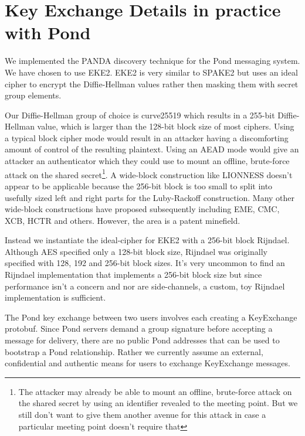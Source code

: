 \documentclass[letterpaper,twocolumn,10pt]{article}
\begin{document}
\section{Key Exchange Details in practice with Pond}

We implemented the PANDA discovery technique for the Pond\cite{pond} messaging
system. We have chosen to use EKE2\cite{bellare2000authenticated}. EKE2 is very
similar to SPAKE2 but uses an ideal cipher to encrypt the Diffie-Hellman values
rather then masking them with secret group elements.

Our Diffie-Hellman group of choice is curve25519\cite{bernstein2006curve25519}
which results in a 255-bit Diffie-Hellman value, which is larger than the
128-bit block size of most ciphers. Using a typical block cipher mode would
result in an attacker having a discomforting amount of control of the resulting
plaintext. Using an AEAD mode would give an attacker an authenticator which
they could use to mount an offline, brute-force attack on the shared
secret\footnote{The attacker may already be able to mount an offline,
brute-force attack on the shared secret by using an identifier revealed to the
meeting point. But we still don't want to give them another avenue for this
attack in case a particular meeting point doesn't require that}. A wide-block
construction like LIONNESS\cite{anderson1996two} doesn't appear to be
applicable because the 256-bit block is too small to split into usefully sized
left and right parts for the Luby-Rackoff construction. Many other wide-block
constructions have proposed subsequently including
EME\cite{halevi2004parallelizable}, CMC\cite{halevi2004parallelizable},
XCB\cite{mcgrew2004extended}, HCTR\cite{wang2005hctr} and others. However, the
area is a patent minefield.

Instead we instantiate the ideal-cipher for EKE2 with a 256-bit block
Rijndael\cite{daemen2002design}. Although AES specified only a 128-bit block
size, Rijndael was originally specified with 128, 192 and 256-bit block sizes.
It's very uncommon to find an Rijndael implementation that implements a 256-bit
block size but since performance isn't a concern and nor are side-channels, a
custom, toy Rijndael implementation is sufficient.

The Pond key exchange between two users involves each creating a KeyExchange
protobuf\cite{pondprotobufs}. Since Pond servers demand a group signature
before accepting a message for delivery, there are no public Pond addresses
that can be used to bootstrap a Pond relationship. Rather we currently assume
an external, confidential and authentic means for users to exchange KeyExchange
messages.
\end{document}

